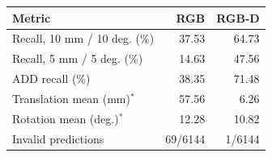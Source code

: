 \begin{tabular}{lrr}
\toprule
Metric & RGB & RGB-D \\
\midrule
Recall, 10 mm / 10 deg. (\%) & 37.53 & 64.73 \\
Recall, 5 mm / 5 deg. (\%) & 14.63 & 47.56 \\
ADD recall (\%) & 38.35 & 71.48 \\
Translation mean (mm)$^{*}$ & 57.56 & 6.26 \\
Rotation mean (deg.)$^{*}$ & 12.28 & 10.82 \\
Invalid predictions & 69/6144 & 1/6144 \\
\bottomrule
\end{tabular}
